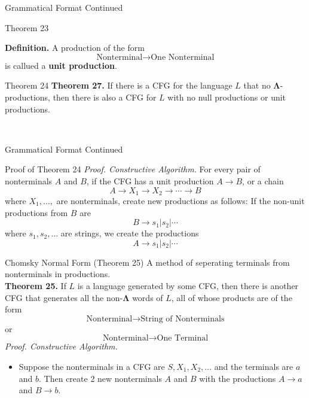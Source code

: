 \documentclass{article}
\begin{document}
\begin{multicols*}{3}
\begin{blackbox}{Grammatical Format Continued}
\begin{brownbox}{Theorem 23}
\begin{enumerate}[leftmargin=7pt]
        \end{enumerate}
    \end{brownbox}
    \textbf{Definition.} A production of the form \\[-1.5ex]
    \[\text{Nonterminal} \rightarrow \text{One Nonterminal}\]
    is callued a \textbf{unit production}.
    \begin{pinkbox}{Theorem 24}
        \textbf{Theorem 27.} If there is a CFG for the language $L$ that no $\boldsymbol{\Lambda}$-productions, then there is also a CFG for $L$ with no null productions or unit productions.
    \end{pinkbox}\\[-2ex]
\end{blackbox}
\begin{blackbox}{Grammatical Format Continued}
    \begin{pinkbox}{Proof of Theorem 24}
        \textit{Proof. Constructive Algorithm.} For every pair of nonterminals $A$ and $B$, if the CFG has a unit production $A \rightarrow B$, or a chain \\[-2ex]
        \[A \rightarrow X_1 \rightarrow X_2 \rightarrow \cdots \rightarrow B\]
        where $X_1,\ldots,$ are nonterminals, create new productions as follows: If the non-unit productions from $B$ are \\[-4ex]
        \[B \rightarrow s_1|s_2|\cdots\] 
        where $s_1,s_2,\ldots$ are strings, we create the productions \\[-4ex]
        \[A \rightarrow s_1|s_2| \cdots\]
    \end{pinkbox}
        \begin{brownbox}{Chomsky Normal Form (Theorem 25)}
            A method of seperating terminals from nonterminals in productions.\\
            \textbf{Theorem 25.} If $L$ is a language generated by some CFG, then there is another CFG that generates all the non-$\boldsymbol{\Lambda}$ words of $L$, all of whose products are of the form\\[-1ex]
            \[\text{Nonterminal} \rightarrow \text{String of Nonterminals}\]
            or\\[-1.25ex]
            \[\text{Nonterminal} \rightarrow \text{One Terminal}\]
            \textit{Proof. Constructive Algorithm.} 
            \begin{itemize}[leftmargin=5pt]
                \item Suppose the nonterminals in a CFG are $S, X_1, X_2,\ldots$ and the terminals are $a$ and $b$. Then create 2 new nonterminals $A$ and $B$ with the productions $A \rightarrow a$ and $B \rightarrow b$. 

\end{itemize}
\end{brownbox}
\end{blackbox}
\end{multicols*}
\end{document}
